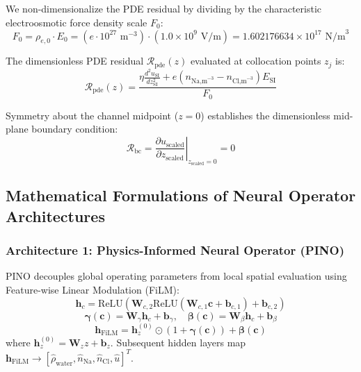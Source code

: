 \documentclass[3p,preprint,12pt,numbers,square,sort&compress]{elsarticle}
\begin{document}
We non-dimensionalize the PDE residual by dividing by the characteristic electroosmotic force density scale $F_0$:
\begin{equation}
    F_0 = \rho_{e,0} \cdot E_0 = \left(e \cdot 10^{27}\text{ m}^{-3}\right) \cdot \left(1.0 \times 10^9\text{ V/m}\right) = 1.602176634 \times 10^{17} \text{ N/m}^3
\end{equation}

The dimensionless PDE residual $\mathcal{R}_{\text{pde}}(z)$ evaluated at collocation points $z_j$ is:
\begin{equation}
    \mathcal{R}_{\text{pde}}(z) = \frac{\eta \frac{d^2 u_{\text{SI}}}{dz_{\text{SI}}^2} + e \left( n_{\text{Na,m}^{-3}} - n_{\text{Cl,m}^{-3}} \right) E_{\text{SI}}}{F_0}
\end{equation}

Symmetry about the channel midpoint ($z=0$) establishes the dimensionless mid-plane boundary condition:
\begin{equation}
    \mathcal{R}_{\text{bc}} = \left. \frac{\partial u_{\text{scaled}}}{\partial z_{\text{scaled}}} \right|_{z_{\text{scaled}}=0} = 0
\end{equation}

\subsection{Mathematical Formulations of Neural Operator Architectures}

\subsubsection{Architecture 1: Physics-Informed Neural Operator (PINO)}
PINO decouples global operating parameters from local spatial evaluation using Feature-wise Linear Modulation (FiLM):
\begin{equation}
    \mathbf{h}_c = \text{ReLU}\left(\mathbf{W}_{c,2} \text{ReLU}\left(\mathbf{W}_{c,1} \mathbf{c} + \mathbf{b}_{c,1}\right) + \mathbf{b}_{c,2}\right)
\end{equation}
\begin{equation}
    \boldsymbol{\gamma}(\mathbf{c}) = \mathbf{W}_{\gamma} \mathbf{h}_c + \mathbf{b}_{\gamma}, \quad \boldsymbol{\beta}(\mathbf{c}) = \mathbf{W}_{\beta} \mathbf{h}_c + \mathbf{b}_{\beta}
\end{equation}
\begin{equation}
    \mathbf{h}_{\text{FiLM}} = \mathbf{h}_z^{(0)} \odot \left(1 + \boldsymbol{\gamma}(\mathbf{c})\right) + \boldsymbol{\beta}(\mathbf{c})
\end{equation}
where $\mathbf{h}_z^{(0)} = \mathbf{W}_z z + \mathbf{b}_z$. Subsequent hidden layers map $\mathbf{h}_{\text{FiLM}} \to [\hat{\rho}_{\text{water}}, \hat{n}_{\text{Na}}, \hat{n}_{\text{Cl}}, \hat{u}]^T$.
\end{document}
